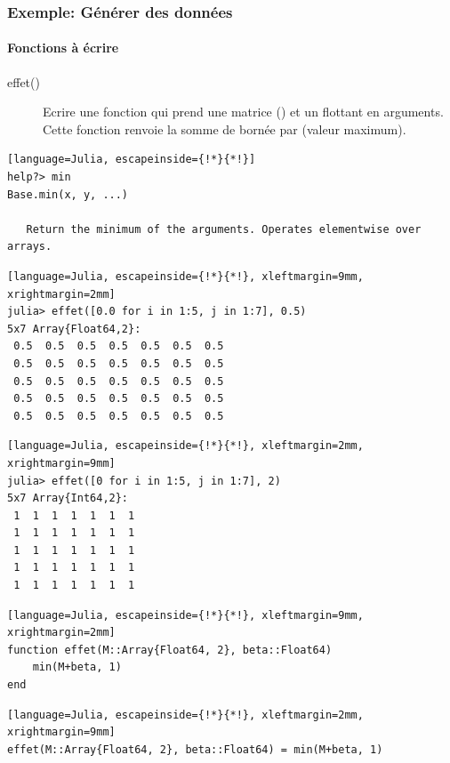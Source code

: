 \begin{frame}[fragile]
    \frametitle{\textcolor{goldenrod2}{Exemple:} Générer des données}
    \framesubtitle{Fonctions à écrire}
    \begin{description}
        \item[effet()] Ecrire une fonction qui prend une matrice  () et un flottant  en arguments. \\Cette fonction renvoie la somme de \cmd{+} bornée par  (valeur maximum).
    \end{description}
    \pause
\begin{lstlisting}[language=Julia, escapeinside={!*}{*!}]
help?> min
Base.min(x, y, ...)

   Return the minimum of the arguments. Operates elementwise over arrays.
\end{lstlisting}
    \pause
    \vspace{-3ex}
\begin{multicols}{2}
\begin{lstlisting}[language=Julia, escapeinside={!*}{*!}, xleftmargin=9mm, xrightmargin=2mm]
julia> effet([0.0 for i in 1:5, j in 1:7], 0.5)
5x7 Array{Float64,2}:
 0.5  0.5  0.5  0.5  0.5  0.5  0.5
 0.5  0.5  0.5  0.5  0.5  0.5  0.5
 0.5  0.5  0.5  0.5  0.5  0.5  0.5
 0.5  0.5  0.5  0.5  0.5  0.5  0.5
 0.5  0.5  0.5  0.5  0.5  0.5  0.5
\end{lstlisting}
\columnbreak
\begin{lstlisting}[language=Julia, escapeinside={!*}{*!}, xleftmargin=2mm, xrightmargin=9mm]
julia> effet([0 for i in 1:5, j in 1:7], 2)
5x7 Array{Int64,2}:
 1  1  1  1  1  1  1
 1  1  1  1  1  1  1
 1  1  1  1  1  1  1
 1  1  1  1  1  1  1
 1  1  1  1  1  1  1
\end{lstlisting}
\end{multicols}
    \vspace{-3ex}
    \pause
    \vspace{-2ex}
\begin{multicols}{2}
\begin{lstlisting}[language=Julia, escapeinside={!*}{*!}, xleftmargin=9mm, xrightmargin=2mm]
function effet(M::Array{Float64, 2}, beta::Float64)
    min(M+beta, 1)
end
\end{lstlisting}
\columnbreak
\begin{lstlisting}[language=Julia, escapeinside={!*}{*!}, xleftmargin=2mm, xrightmargin=9mm]
effet(M::Array{Float64, 2}, beta::Float64) = min(M+beta, 1)
\end{lstlisting}
\end{multicols}
\end{frame}


